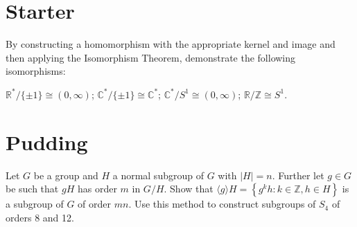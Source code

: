 \documentclass[answers]{exam}
\begin{document}
\section*{Starter}
\begin{questions}
\question%
By constructing a homomorphism with the appropriate kernel and image and then applying the Isomorphism Theorem, demonstrate the following isomorphisms:
\begin{subparts}
\subpart $\mathbb{R}^{*} /\{ \pm 1\} \cong(0, \infty)$;
\subpart $\mathbb{C}^{*} /\{ \pm 1\} \cong \mathbb{C}^{*}$;
\subpart $\mathbb{C}^{*} / S^{1} \cong(0, \infty)$;
\subpart $\mathbb{R} / \mathbb{Z} \cong S^{1}$.
\end{subparts}

\end{questions}

\section*{Pudding}
\begin{questions}
\question%
\begin{subparts}
\subpart Let $G$ be a group and $H$ a normal subgroup of $G$ with $|H|=n$. Further let $g \in G$ be such that $g H$ has order $m$ in $G / H$. Show that $\langle g\rangle H=\left\{g^{k} h: k \in \mathbb{Z}, h \in H\right\}$ is a subgroup of $G$ of order $m n$.
\subpart Use this method to construct subgroups of $S_{4}$ of orders 8 and 12.
\end{subparts}

\end{questions}
\end{document}
